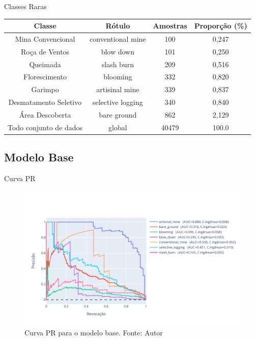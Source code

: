 \documentclass{beamer}
\begin{document}
        
\begin{frame}{Classes Raras}
    \fontsize{7pt}{8pt}\selectfont
    \center
    \begin{tabular}{*{4}{c}}
        \hline
        Classe                  &            Rótulo &  Amostras      &  Proporção (\%) \\
        \hline
        Mina Convencional       & conventional mine &        100     &       0,247 \\
        Roça de Ventos          &         blow down &        101     &       0,250 \\
        Queimada                &        slash burn &        209     &       0,516 \\
        Florescimento           &          blooming &        332     &       0,820 \\
        Garimpo                 &    artisinal mine &        339     &       0,837 \\
        Desmatamento Seletivo   & selective logging &        340     &       0,840 \\
        Área Descoberta         &       bare ground &        862     &       2,129 \\
        Todo conjunto de dados  &            global &        40479   &       100.0 \\
        \hline
    \end{tabular}    
\end{frame}        
    
\subsection*{Modelo Base}
\begin{frame}{Curva PR}
\begin{figure}[!ht]
    \centering
    \includegraphics[width=\columnwidth]{Imagens/results/rsp-resnet-50_planet_pt/Curva PR para classes raras.pdf}
    \caption{ Curva PR para o modelo base. Fonte: Autor}
   \label{fig:CurvaPRResnet50}
\end{figure}     
\end{frame}
\end{document}
